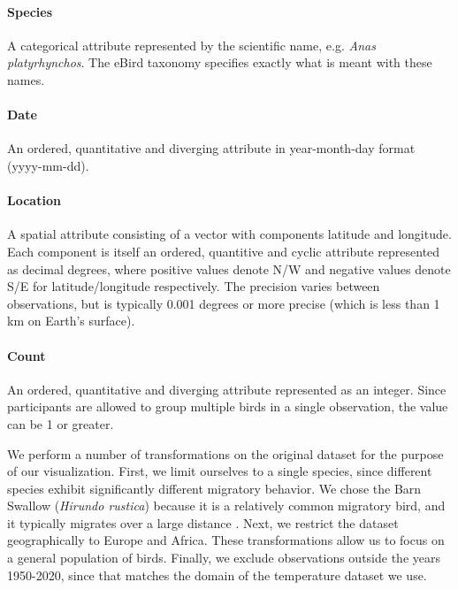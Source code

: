 \documentclass[journal]{vgtc}                %
\begin{document}
\paragraph{Species} A categorical attribute represented by the scientific name, e.g. \textit{Anas platyrhynchos}. The eBird taxonomy\cite{ebird2019taxonomy} specifies exactly what is meant with these names.

\paragraph{Date} An ordered, quantitative and diverging attribute in year-month-day format (yyyy-mm-dd).

\paragraph{Location} A spatial attribute consisting of a vector with components latitude and longitude. Each component is itself an ordered, quantitive and cyclic attribute represented as decimal degrees, where positive values denote N/W and negative values denote S/E for latitude/longitude respectively. The precision varies between observations, but is typically 0.001 degrees or more precise (which is less than 1 km on Earth's surface).

\paragraph{Count} An ordered, quantitative and diverging attribute represented as an integer. Since participants are allowed to group multiple birds in a single observation, the value can be 1 or greater.

\vspace{2mm}

We perform a number of transformations on the original dataset for the purpose of our visualization. First, we limit ourselves to a single species, since different species exhibit significantly different migratory behavior. We chose the Barn Swallow (\textit{Hirundo rustica}) because it is a relatively common migratory bird, and it typically migrates over a large distance \cite{turner1989swallow}. Next, we restrict the dataset geographically to Europe and Africa. These transformations allow us to focus on a general population of birds. Finally, we exclude observations outside the years 1950-2020, since that matches the domain of the temperature dataset we use.

\vspace{2mm}
\end{document}
